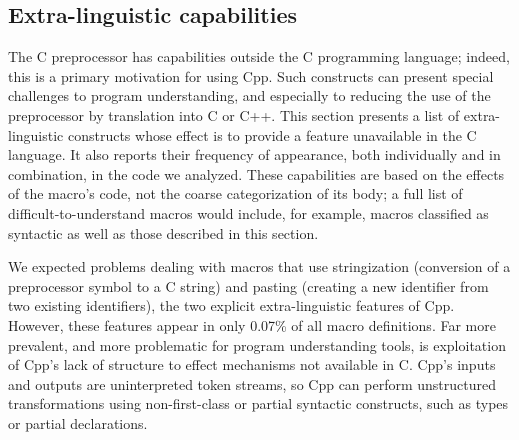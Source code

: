 \documentclass[10pt]{article}
\begin{document}





\subsection{Extra-linguistic capabilities}
\label{sec:extra-linguistic}

The C preprocessor has capabilities outside the C programming language;
indeed, this is a primary motivation for using Cpp.  Such constructs can
present special challenges to program understanding, and especially to
reducing the use of the preprocessor by translation into C or C++.  This
section presents a list of extra-linguistic constructs whose effect is to
provide a feature unavailable in the C language.  It also reports their
frequency of appearance, both individually and in combination, in the code we analyzed.
These capabilities are based on the effects of the macro's code,
not the coarse categorization of its body; a full list of
difficult-to-understand macros would include, for example, macros classified as
syntactic as well as those described in this section.


We expected problems dealing with macros that use stringization (conversion
of a preprocessor symbol to a C string) and pasting (creating a new
identifier from two existing identifiers), the two explicit
extra-linguistic features of Cpp.  However, these features appear in only
0.07\% of all macro definitions.  Far more prevalent, and more problematic
for program understanding tools, is exploitation of Cpp's lack of structure
to effect mechanisms not available in C\@.  Cpp's inputs and outputs are
uninterpreted token streams, so Cpp can perform unstructured transformations
using non-first-class or partial syntactic constructs, such as types or
partial declarations.
\end{document}
